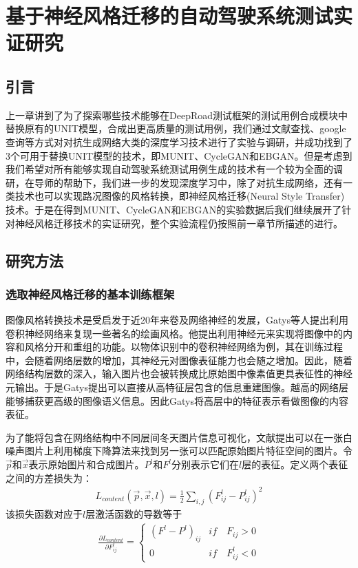 \chapter{基于神经风格迁移的自动驾驶系统测试实证研究}


\section{引言}

上一章讲到了为了探索哪些技术能够在DeepRoad测试框架的测试用例合成模块中替换原有的UNIT模型，合成出更高质量的测试用例，我们通过文献查找、google查询等方式对对抗生成网络大类的深度学习技术进行了实验与调研，并成功找到了3个可用于替换UNIT模型的技术，即MUNIT\cite{MUNIT}、CycleGAN\cite{CycleGAN}和EBGAN\cite{ebgan}。但是考虑到我们希望对所有能够实现自动驾驶系统测试用例生成的技术有一个较为全面的调研，在导师的帮助下，我们进一步的发现深度学习中，除了对抗生成网络，还有一类技术也可以实现路况图像的风格转换，即神经风格迁移(Neural Style Transfer)技术。于是在得到MUNIT、CycleGAN和EBGAN的实验数据后我们继续展开了针对神经风格迁移技术的实证研究，整个实验流程仍按照前一章节所描述的进行。

\section{研究方法}

\subsection{选取神经风格迁移的基本训练框架}

图像风格转换技术是受启发于近20年来卷及网络神经的发展，Gatys等人\cite{nst}提出利用卷积神经网络来复现一些著名的绘画风格。他提出利用神经元来实现将图像中的内容和风格分开和重组的功能。以物体识别中的卷积神经网络为例，其在训练过程中，会随着网络层数的增加，其神经元对图像表征能力也会随之增加。因此，随着网络结构层数的深入，输入图片也会被转换成比原始图中像素值更具表征性的神经元输出。于是Gatys提出可以直接从高特征层包含的信息重建图像。越高的网络层能够捕获更高级的图像语义信息。因此Gatys将高层中的特征表示看做图像的内容表征。

为了能将包含在网络结构中不同层间冬天图片信息可视化，文献\cite{nst}提出可以在一张白噪声图片上利用梯度下降算法来找到另一张可以匹配原始图片特征空间的图片。令$\overrightarrow{p}$和$\overrightarrow{x}$表示原始图片和合成图片。$P^l$和$F^l$分别表示它们在$l$层的表征。定义两个表征之间的方差损失为：
\begin{align}
    L_{content}(\overrightarrow{p},\overrightarrow{x},l)=\frac{1}{2}\sum_{i,j}(F_{ij}^l-P_{ij}^l)^2
\end{align}
该损失函数对应于$l$层激活函数的导数等于 
\begin{align}
    \frac{\partial L_{content}}{\partial F_{ij}^l} = \begin{cases}
        (F^l-P^l)_{ij}  & if \quad F_{ij} > 0 \\
        0 & if \quad F_{ij}^l \lt 0
    \end{cases}
\end{align}

